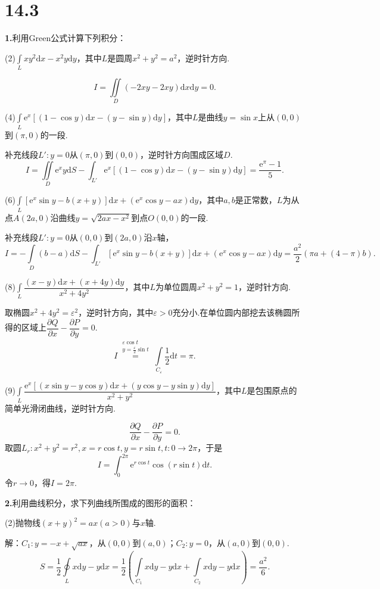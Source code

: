 \documentclass[12pt, a4paper]{article}
\newcommand{\e}{\mathrm{e}}
\newcommand{\dif}{\mathrm{d}}
\begin{document}
\section*{14.3}
\textbf{1.}利用Green公式计算下列积分：

(2)\(\int\limits_L xy^2 \dif x - x^2y \dif y\)，其中\(L\)是圆周\(x^2 + y^2 = a^2\)，逆时针方向.

\[I = \iint\limits_D (-2xy - 2xy) \dif x \dif y = 0.\]

(4)\(\int\limits_L \e^x[(1 - \cos y) \dif x - (y - \sin y) \dif y]\)，其中\(L\)是曲线\(y = \sin x\)上从\((0, 0)\)到\((\pi, 0)\)的一段.

补充线段\(L':y = 0\)从\((\pi, 0)\)到\((0, 0)\)，逆时针方向围成区域\(D\).
\[I = \iint\limits_D \e^xy \dif S - \int_{L'} \e^x[(1 - \cos y) \dif x - (y - \sin y) \dif y] = \frac{\e^\pi - 1}{5}.\]

(6)\(\int\limits_L [\e^x\sin y - b(x + y)] \dif x + (\e^x\cos y - ax) \dif y\)，其中\(a, b\)是正常数，\(L\)为从点\(A(2a, 0)\)沿曲线\(y = \sqrt{2ax - x^2}\)到点\(O(0, 0)\)的一段.

补充线段\(L':y = 0\)从\((0, 0)\)到\((2a, 0)\)沿\(x\)轴，
\[I = -\int\limits_D (b - a) \dif S - \int_{L'} [\e^x\sin y - b(x + y)] \dif x + (\e^x\cos y - ax) \dif y = \frac{a^2}{2}(\pi a + (4 - \pi)b).\]

(8)\(\int\limits_L \dfrac{(x - y) \dif x + (x + 4y) \dif y}{x^2 + 4y^2}\)，其中\(L\)为单位圆周\(x^2 + y^2 = 1\)，逆时针方向.

取椭圆\(x^2 + 4y^2 = \varepsilon^2\)，逆时针方向，其中\(\varepsilon > 0\)充分小.在单位圆内部挖去该椭圆所得的区域上\(\dfrac{\partial Q}{\partial x} - \dfrac{\partial P}{\partial y} = 0\).
\[I \overset{\substack{\varepsilon\cos t \\ y = \frac{\varepsilon}{2}\sin t}}{=} \int\limits_{C_\varepsilon} \frac{1}{2} \dif t = \pi.\]

(9)\(\int\limits_L \dfrac{\e^x[(x\sin y - y\cos y) \dif x + (y\cos y - y\sin y) \dif y]}{x^2 + y^2}\)，其中\(L\)是包围原点的简单光滑闭曲线，逆时针方向.

\[\frac{\partial Q}{\partial x} - \frac{\partial P}{\partial y} = 0.\]
取圆\(L_r:x^2 + y^2 = r^2, x = r\cos t, y = r\sin t, t:0 \to 2\pi\)，于是
\[I = \int_{0}^{2\pi} \e^{r\cos t}\cos(r\sin t) \dif t.\]
令\(r \to 0\)，得\(I = 2\pi\).

\textbf{2.}利用曲线积分，求下列曲线所围成的图形的面积：

(2)抛物线\((x + y)^2 = ax(a > 0)\)与\(x\)轴.

解：\(C_1:y = -x + \sqrt{ax}\)，从\((0, 0)\)到\((a, 0)\)；\(C_2:y = 0\)，从\((a, 0)\)到\((0, 0)\).
\[S = \frac{1}{2}\oint\limits_L x \dif y - y \dif x = \frac{1}{2}\left(\int\limits_{C_1} x \dif y - y \dif x + \int\limits_{C_2} x \dif y - y \dif x\right) = \frac{a^2}{6}.\]
\end{document}
